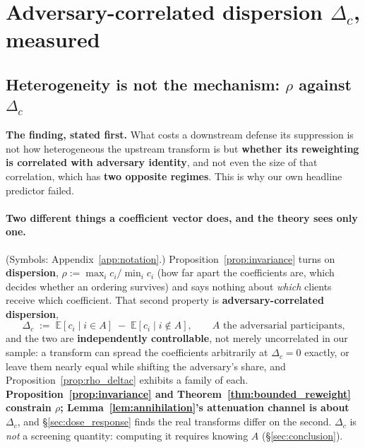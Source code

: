\documentclass{article}
\begin{document}
\section{Adversary-correlated dispersion $\Delta_c$, measured}
\label{app:delta_c}

\subsection{Heterogeneity is not the mechanism: $\rho$ against $\Delta_c$}
\label{sec:rho_vs_deltac}

\noindent \textbf{The finding, stated first.} What costs a downstream defense its suppression is not how heterogeneous the upstream transform is but \textbf{whether its reweighting is correlated with adversary identity}, and not even the size of that correlation, which has \textbf{two opposite regimes}. This is why our own headline predictor failed.

\paragraph{Two different things a coefficient vector does, and the theory sees only one.} (Symbols: Appendix~\ref{app:notation}.) Proposition~\ref{prop:invariance} turns on \textbf{dispersion}, $\rho := \max_i c_i/\min_i c_i$ (how far apart the coefficients are, which decides whether an ordering survives) and says nothing about \emph{which} clients receive which coefficient. That second property is \textbf{adversary-correlated dispersion},
\[
\Delta_c \;:=\; \mathbb{E}[c_i \mid i \in A] \;-\; \mathbb{E}[c_i \mid i \notin A],
\qquad A \text{ the adversarial participants,}
\]
and the two are \textbf{independently controllable}, not merely uncorrelated in our sample: a transform can spread the coefficients arbitrarily at $\Delta_c = 0$ exactly, or leave them nearly equal while shifting the adversary's share, and Proposition~\ref{prop:rho_deltac} exhibits a family of each. \textbf{Proposition~\ref{prop:invariance} and Theorem~\ref{thm:bounded_reweight} constrain $\rho$; Lemma~\ref{lem:annihilation}'s attenuation channel is about $\Delta_c$}, and \S\ref{sec:dose_response} finds the real transforms differ on the second. $\Delta_c$ is \emph{not} a screening quantity: computing it requires knowing $A$ (\S\ref{sec:conclusion}).
\end{document}
